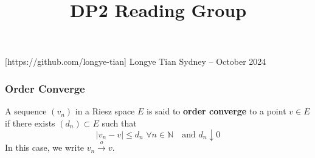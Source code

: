 \documentclass[11pt,xcolor={dvipsnames},hyperref={pdftex,pdfpagemode=UseNone,hidelinks,pdfdisplaydoctitle=true},usepdftitle=false]{beamer}
\begin{document}
\title{DP2 Reading Group}

\information
%
[https://github.com/longye-tian]
%
{Longye Tian}
%
{Sydney -- October 2024}

\frame{\titlepage}

\begin{frame}
\frametitle{Order Converge}
\begin{definition}
A sequence $(v_n)$ in a Riesz space $E$ is said to \textbf{order converge} to a point $v\in E$ if there exists $(d_n)\subset E$ such that 
$$
|v_n-v|\le d_n\,\,\forall n\in\mathbb{N} \quad\text{and $d_n\downarrow 0$}
$$
In this case, we write $v_n\stackrel { o } {\to} v$.
\end{definition}
\end{frame}
\end{document}
